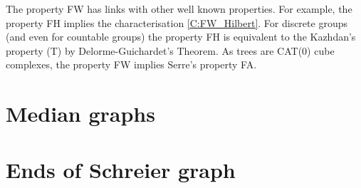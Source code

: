 \documentclass[a4paper]{article}
\theoremstyle{remark}%
\begin{document}
The property FW has links with other well known properties. For example, the property FH implies the characterisation \ref{C:FW_Hilbert}. For discrete groups (and even for countable groups) the property FH is equivalent to the Kazhdan's property (T) by Delorme-Guichardet's Theorem. As trees are CAT(0) cube complexes, the property FW implies Serre's property FA. %
%
%
\section{Median graphs}

\section{Ends of Schreier graph}














\enddocument
\end{document}
